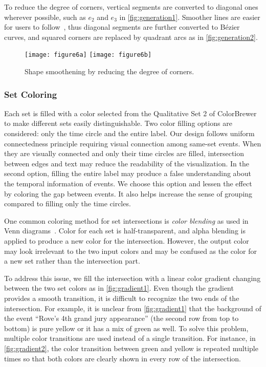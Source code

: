 To reduce the degree of corners, vertical segments are converted to diagonal ones wherever possible, such as  $e_2$ and $e_3$ in \autoref{fig:generation1}. Smoother lines are easier for users to follow~\cite{Kim2010}, thus diagonal segments are further converted to B\'{e}zier curves, and squared corners are replaced by quadrant arcs as in \autoref{fig:generation2}.

\begin{figure}
	\centering
		{\texttt{[image: figure6a]}}
	\hfill
		{\texttt{[image: figure6b]}}
	\caption{Shape smoothening by reducing the degree of corners.}
	\label{fig:generation}
\end{figure}

\subsubsection{Set Coloring}
\label{sub:ts-eventmembership}
Each set is filled with a color selected from the Qualitative Set 2 of ColorBrewer~\cite{Harrower2003} to make different sets easily distinguishable. Two color filling options are considered: only the time circle and the entire label. Our design follows uniform connectedness principle requiring visual connection among same-set events. When they are visually connected and only their time circles are filled, intersection between edges and text may reduce the readability of the visualization. In the second option, filling the entire label may produce a false understanding about the temporal information of events. We choose this option and lessen the effect by coloring the gap between events. It also helps increase the sense of grouping compared to filling only the time circles.

One common coloring method for set intersections is \emph{color blending} as used in Venn diagrams~\cite{Ware2013}. Color for each set is half-transparent, and alpha blending is applied to produce a new color for the intersection. However, the output color may look irrelevant to the two input colors and may be confused as the color for a new set rather than the intersection part.

To address this issue, we fill the intersection with a linear color gradient changing between the two set colors as in \autoref{fig:gradient1}. Even though the gradient provides a smooth transition, it is difficult to recognize the two ends of the intersection. For example, it is unclear from \autoref{fig:gradient1} that the background of the event ``Rove's 4th grand jury appearance'' (the second row from top to bottom) is pure yellow or it has a mix of green as well. To solve this problem, multiple color transitions are used instead of a single transition. For instance, in \autoref{fig:gradient2}, the color transition between green and yellow is repeated multiple times so that both colors are clearly shown in every row of the intersection.

